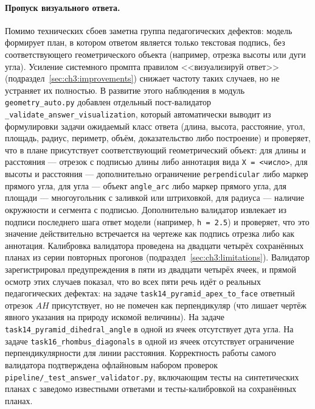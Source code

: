 \paragraph{Пропуск визуального ответа.} Помимо технических сбоев заметна группа педагогических дефектов: модель формирует план, в котором ответом является только текстовая подпись, без соответствующего геометрического объекта (например, отрезка высоты или дуги угла). Усиление системного промпта правилом <<визуализируй ответ>> (подраздел~\ref{sec:ch3:improvements}) снижает частоту таких случаев, но не устраняет их полностью. В развитие этого наблюдения в модуль \texttt{geometry\_auto.py} добавлен отдельный пост-\allowbreak валидатор \texttt{\_validate\_answer\_visualization}, который автоматически выводит из формулировки задачи ожидаемый класс ответа (длина, высота, расстояние, угол, площадь, радиус, периметр, объём, доказательство либо построение) и проверяет, что в плане присутствует соответствующий геометрический объект: для длины и расстояния --- отрезок с подписью длины либо аннотация вида \verb|X = <число>|, для высоты и расстояния --- дополнительно ограничение \texttt{perpendicular} либо маркер прямого угла, для угла --- объект \texttt{angle\_arc} либо маркер прямого угла, для площади --- многоугольник с заливкой или штриховкой, для радиуса --- наличие окружности и сегмента с подписью. Дополнительно валидатор извлекает из подписи последнего шага ответ модели (например, \verb|h = 2.5|) и проверяет, что это значение действительно встречается на чертеже как подпись отрезка либо как аннотация. Калибровка валидатора проведена на двадцати четырёх сохранённых планах из серии повторных прогонов (подраздел~\ref{sec:ch3:limitations}). Валидатор зарегистрировал предупреждения в пяти из двадцати четырёх ячеек, и прямой осмотр этих случаев показал, что во всех пяти речь идёт о реальных педагогических дефектах: на задаче \texttt{task14\_pyramid\_apex\_to\_face} ответный отрезок \(AH\) присутствует, но не помечен как перпендикуляр (что лишает чертёж явного указания на природу искомой величины). На задаче \texttt{task14\_pyramid\_dihedral\_angle} в одной из ячеек отсутствует дуга угла. На задаче \texttt{task16\_rhombus\_diagonals} в одной из ячеек отсутствует ограничение перпендикулярности для линии расстояния. Корректность работы самого валидатора подтверждена офлайновым набором проверок \texttt{pipeline/\_test\_answer\_validator.py}, включающим тесты на синтетических планах с заведомо известными ответами и тесты\nobreakdash-калибровкой на сохранённых планах.


